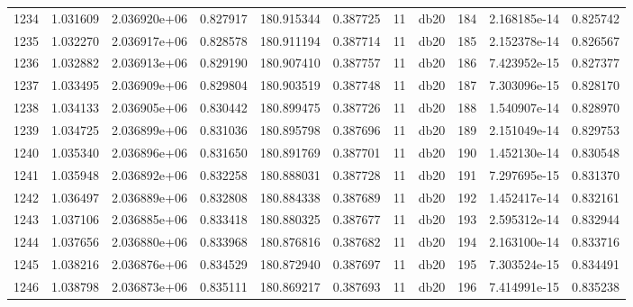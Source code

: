 \begin{tabular}{lrrrrrrlrrr}
1234 &    1.031609 &        2.036920e+06 &  0.827917 &              180.915344 &    0.387725 &      11 &         db20 &    184 &   2.168185e-14 &      0.825742 \\
1235 &    1.032270 &        2.036917e+06 &  0.828578 &              180.911194 &    0.387714 &      11 &         db20 &    185 &   2.152378e-14 &      0.826567 \\
1236 &    1.032882 &        2.036913e+06 &  0.829190 &              180.907410 &    0.387757 &      11 &         db20 &    186 &   7.423952e-15 &      0.827377 \\
1237 &    1.033495 &        2.036909e+06 &  0.829804 &              180.903519 &    0.387748 &      11 &         db20 &    187 &   7.303096e-15 &      0.828170 \\
1238 &    1.034133 &        2.036905e+06 &  0.830442 &              180.899475 &    0.387726 &      11 &         db20 &    188 &   1.540907e-14 &      0.828970 \\
1239 &    1.034725 &        2.036899e+06 &  0.831036 &              180.895798 &    0.387696 &      11 &         db20 &    189 &   2.151049e-14 &      0.829753 \\
1240 &    1.035340 &        2.036896e+06 &  0.831650 &              180.891769 &    0.387701 &      11 &         db20 &    190 &   1.452130e-14 &      0.830548 \\
1241 &    1.035948 &        2.036892e+06 &  0.832258 &              180.888031 &    0.387728 &      11 &         db20 &    191 &   7.297695e-15 &      0.831370 \\
1242 &    1.036497 &        2.036889e+06 &  0.832808 &              180.884338 &    0.387689 &      11 &         db20 &    192 &   1.452417e-14 &      0.832161 \\
1243 &    1.037106 &        2.036885e+06 &  0.833418 &              180.880325 &    0.387677 &      11 &         db20 &    193 &   2.595312e-14 &      0.832944 \\
1244 &    1.037656 &        2.036880e+06 &  0.833968 &              180.876816 &    0.387682 &      11 &         db20 &    194 &   2.163100e-14 &      0.833716 \\
1245 &    1.038216 &        2.036876e+06 &  0.834529 &              180.872940 &    0.387697 &      11 &         db20 &    195 &   7.303524e-15 &      0.834491 \\
1246 &    1.038798 &        2.036873e+06 &  0.835111 &              180.869217 &    0.387693 &      11 &         db20 &    196 &   7.414991e-15 &      0.835238 \\

\end{tabular}
